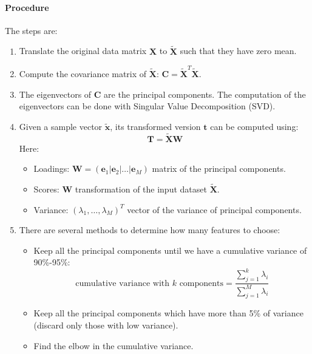 \paragraph*{Procedure}
The steps are: 
\begin{enumerate}
    \item Translate the original data matrix $\mathbf{X}$ to $\tilde{\mathbf{X}}$ such that they have zero mean.
    \item Compute the covariance matrix of $\tilde{\mathbf{X}}$: $\mathbf{C}=\tilde{\mathbf{X}}^T\tilde{\mathbf{X}}$. 
    \item The eigenvectors of $\mathbf{C}$ are the principal components. 
        The computation of the eigenvectors can be done with Singular Value Decomposition (SVD). 
    \item Given a sample vector $\tilde{\mathbf{x}}$, its transformed version $\mathbf{t}$ can be computed using:
        \[\mathbf{T}=\tilde{\mathbf{X}}\mathbf{W}\]
        Here: 
        \begin{itemize}
            \item Loadings: $\mathbf{W} = (\mathbf{e}_1|\mathbf{e}_2|\ldots |\mathbf{e}_M)$ matrix of the principal components. 
            \item Scores: $\mathbf{W}$ transformation of the input dataset $\tilde{\mathbf{X}}$. 
            \item Variance: $(\lambda_1,\ldots, \lambda_M)^T$ vector of the variance of principal components.
        \end{itemize}
    \item There are several methods to determine how many features to choose:
        \begin{itemize}
            \item Keep all the principal components until we have a cumulative variance of 90\%-95\%:
                \[\text{cumulative variance with }k\text{ components}=\dfrac{\sum_{j=1}^k\lambda_i}{\sum_{j=1}^M\lambda_i}\]
            \item Keep all the principal components which have more than 5\% of variance (discard only those with low variance).
            \item Find the elbow in the cumulative variance.
        \end{itemize}
\end{enumerate}

